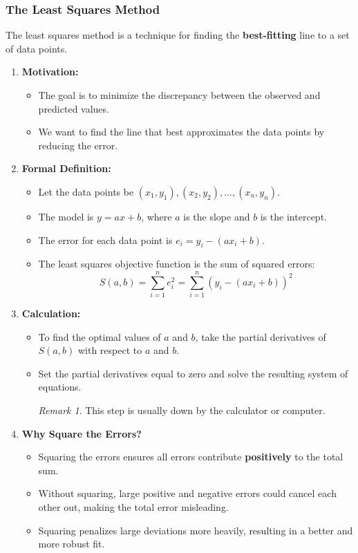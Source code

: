 \documentclass[math,code]{amznotes}
\theoremstyle{remark}
\newtheorem*{remark}{Remark}
\begin{document}
\subsubsection{The Least Squares Method}
The least squares method is a technique for finding the \textbf{best-fitting} line to a set of data points.
\begin{enumerate}
    \item \textbf{Motivation:}
    \begin{itemize}
        \item The goal is to minimize the discrepancy between the observed and predicted values.
        \item We want to find the line that best approximates the data points by reducing the error.
    \end{itemize}
    \item \textbf{Formal Definition:}
    \begin{itemize}
        \item Let the data points be \((x_1, y_1), (x_2, y_2), \dots, (x_n, y_n)\).
        \item The model is \(y = ax + b\), where \(a\) is the slope and \(b\) is the intercept.
        \item The error for each data point is \(e_i = y_i - (ax_i + b)\).
        \item The least squares objective function is the sum of squared errors:
        \[
        S(a, b) = \sum_{i=1}^{n} e_i^2 = \sum_{i=1}^{n} \left( y_i - (ax_i + b) \right)^2
        \]
    \end{itemize}
    \item \textbf{Calculation:}
    \begin{itemize}
        \item To find the optimal values of \(a\) and \(b\), take the partial derivatives of \(S(a, b)\) with respect to \(a\) and \(b\).
        \item Set the partial derivatives equal to zero and solve the resulting system of equations.
        \begin{notebox}
            \begin{remark}
                This step is usually down by the calculator or computer.
            \end{remark}
        \end{notebox}
    \end{itemize}
    \item \textbf{Why Square the Errors?}
    \begin{itemize}
        \item Squaring the errors ensures all errors contribute \textbf{positively} to the total sum.
        \item Without squaring, large positive and negative errors could cancel each other out, making the total error misleading.
        \item Squaring penalizes large deviations more heavily, resulting in a better and more robust fit.
    \end{itemize}
\end{enumerate}
\end{document}
